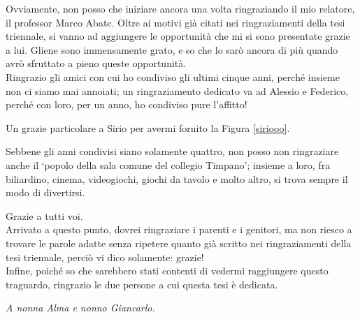 Ovviamente, non posso che iniziare ancora una volta ringraziando il mio relatore, il professor Marco Abate. Oltre ai motivi già citati nei ringraziamenti della tesi triennale, si vanno ad aggiungere le opportunità che mi si sono presentate grazie a lui. Gliene sono immensamente grato, e so che lo sarò ancora di più quando avrò sfruttato a pieno queste opportunità.\\

Ringrazio gli amici con cui ho condiviso gli ultimi cinque anni, perché insieme non ci siamo mai annoiati; un ringraziamento dedicato va ad Alessio e Federico, perché con loro, per un anno, ho condiviso pure l'affitto!

Un grazie particolare a Sirio per avermi fornito la Figura \ref{siriooo}.

Sebbene gli anni condivisi siano solamente quattro, non posso non ringraziare anche il `popolo della sala comune del collegio Timpano'; insieme a loro, fra biliardino, cinema, videogiochi, giochi da tavolo e molto altro, si trova sempre il modo di divertirsi.

Grazie a tutti voi.\\

Arrivato a questo punto, dovrei ringraziare i parenti e i genitori, ma non riesco a trovare le parole adatte senza ripetere quanto già scritto nei ringraziamenti della tesi triennale, perciò vi dico solamente: grazie!\\

Infine, poiché so che sarebbero stati contenti di vedermi raggiungere questo traguardo, ringrazio le due persone a cui questa tesi è dedicata.

\textit{A nonna Alma e nonno Giancarlo.}
